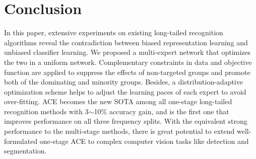 \section{Conclusion}
In this paper, extensive experiments on existing long-tailed recognition algorithms reveal the contradiction between biased representation learning and unbiased classifier learning. We proposed a multi-expert network that optimizes the two in a uniform network. Complementary constraints in data and objective function are applied to suppress the effects of non-targeted groups and promote both of the dominating and minority groups. Besides, a distribution-adaptive optimization scheme helps to adjust the learning paces of each expert to avoid over-fitting. ACE becomes the new SOTA among all one-stage long-tailed recognition methods with 3$\sim$10$\%$ accuracy gain, and is the first one that improves performance on all three frequency splits. With the equivalent strong performance to the multi-stage methods, there is great potential to extend well-formulated one-stage ACE to complex computer vision tasks like detection and segmentation.
{\small \balance
}

